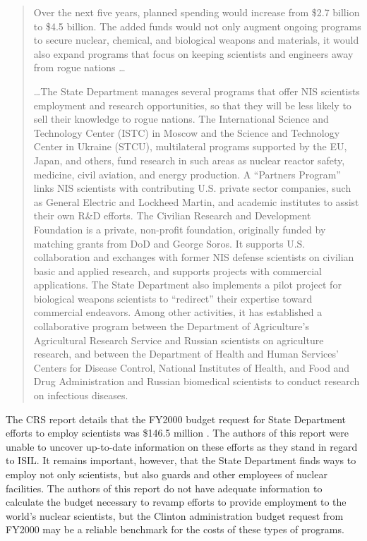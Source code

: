 \documentclass{report}
\begin{document}
\blockquote{Over the next five years, planned spending would increase from \$2.7 billion to \$4.5 billion. The added funds would not only augment ongoing programs to secure nuclear, chemical, and biological weapons and materials, it would also expand programs that focus on keeping scientists and engineers away from rogue nations \ldots

\ldots The State Department manages several programs that offer NIS scientists employment and research opportunities, so that they will be less likely to sell their knowledge to rogue nations. The International Science and Technology Center (ISTC) in Moscow and the Science and Technology Center in Ukraine (STCU), multilateral programs supported by the EU, Japan, and others, fund research in such areas as nuclear reactor safety, medicine, civil aviation, and energy production. A \enquote{Partners Program} links NIS scientists with contributing U.S. private sector companies, such as General Electric and Lockheed Martin, and academic institutes to assist their own R\&D efforts. The Civilian Research and Development Foundation  is a private, non-profit foundation, originally funded by matching grants from DoD and George Soros. It supports U.S. collaboration and exchanges with former NIS defense scientists on civilian basic and applied research, and supports projects with commercial applications. The State Department also implements a pilot project for biological weapons scientists to \enquote{redirect} their expertise toward commercial endeavors. Among other activities, it has established a collaborative program between the Department of Agriculture's Agricultural Research Service and Russian scientists on agriculture research, and between the Department of Health and Human Services' Centers for Disease Control, National Institutes of Health, and Food and Drug Administration and Russian biomedical scientists to conduct research on infectious diseases. }

The CRS report details that the FY2000 budget request for State Department efforts to employ scientists was \$146.5 million \cite{Woolf1999}. The authors of this report were unable to uncover up-to-date information on these efforts as they stand in regard to ISIL. It remains important, however, that the State Department finds ways to employ not only scientists, but also guards and other employees of nuclear facilities. The authors of this report do not have adequate information to calculate the budget necessary to revamp efforts to provide employment to the world's nuclear scientists, but the Clinton administration budget request from FY2000 may be a reliable benchmark for the costs of these types of programs. 
\end{document}
